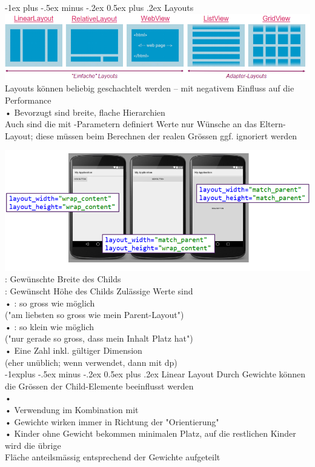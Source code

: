\documentclass[10pt,landscape,a4paper]{article}
\makeatletter
\renewcommand{\section}{\@startsection{section}{1}{0mm}%
                                {-1ex plus -.5ex minus -.2ex}%
                                {0.5ex plus .2ex}%
                                {\normalfont\large\bfseries}}
\renewcommand{\subsection}{\@startsection{subsection}{2}{0mm}%
                                {-1explus -.5ex minus -.2ex}%
                                {0.5ex plus .2ex}%
                                {\normalfont\small\bfseries}}
\makeatother
\begin{document}
\begin{multicols*}{3}
\section{Layouts}
\includegraphics[scale=0.4]{Bilder/layouts.PNG}
Layouts können beliebig geschachtelt werden – mit negativem Einfluss auf die Performance\\
• Bevorzugt sind breite, flache Hierarchien\\
Auch sind die mit -Parametern definiert Werte nur Wünsche an das Eltern-Layout;
diese müssen beim Berechnen der realen Grössen ggf. ignoriert werden

\includegraphics[scale=0.4]{Bilder/wrap_content-Match-parent.PNG}
: Gewünschte Breite des Childs\\
: Gewünscht Höhe des Childs
Zulässige Werte sind\\
• : so gross wie möglich\\
("am liebsten so gross wie mein Parent-Layout")\\
• : so klein wie möglich\\
("nur gerade so gross, dass mein Inhalt Platz hat")\\
• Eine Zahl inkl. gültiger Dimension\\
(eher unüblich; wenn verwendet, dann mit dp)\\


\subsection{Linear Layout}
Durch Gewichte können die Grössen der Child-Elemente beeinflusst werden\\
• \\
• Verwendung im Kombination mit \\
• Gewichte wirken immer in Richtung der "Orientierung"\\
• Kinder ohne Gewicht bekommen minimalen Platz, auf die restlichen Kinder wird die übrige\\ Fläche anteilsmässig entsprechend der Gewichte aufgeteilt\\


\end{multicols*}
\end{document}
